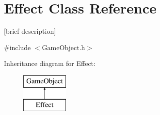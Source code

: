 \hypertarget{class_effect}{\section{Effect Class Reference}
\label{class_effect}
}


\mbox{[}brief description\mbox{]}  




{\ttfamily \#include $<$Game\-Object.\-h$>$}

Inheritance diagram for Effect\-:\begin{figure}[H]
\begin{center}
\leavevmode
\includegraphics[height=2.000000cm]{class_effect}
\end{center}
\end{figure}
